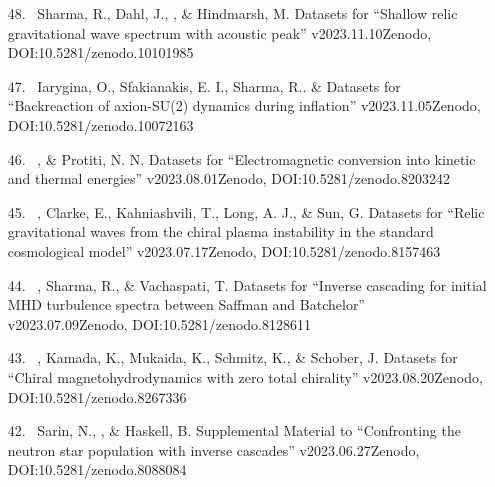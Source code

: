 \begin{itemize}
\item[{48.}~]
Sharma, R., Dahl, J., \Brandenburg, \& Hindmarsh, M.
{Datasets for ``Shallow relic gravitational wave spectrum with acoustic peak'' v2023.11.10}{Zenodo, DOI:10.5281/zenodo.10101985}

\item[{47.}~]
Iarygina, O., Sfakianakis, E. I., Sharma, R.. \& \Brandenburg{}
{Datasets for ``Backreaction of axion-SU(2) dynamics during inflation'' v2023.11.05}{Zenodo, DOI:10.5281/zenodo.10072163}

\item[{46.}~]
\Brandenburg, \& Protiti, N. N.
{Datasets for ``Electromagnetic conversion into kinetic and thermal energies'' v2023.08.01}{Zenodo, DOI:10.5281/zenodo.8203242}

\item[{45.}~]
\Brandenburg, Clarke, E., Kahniashvili, T., Long, A. J., \& Sun, G.
{Datasets for ``Relic gravitational waves from the chiral plasma instability in the standard cosmological model'' v2023.07.17}{Zenodo, DOI:10.5281/zenodo.8157463}

\item[{44.}~]
\Brandenburg, Sharma, R., \& Vachaspati, T.
{Datasets for ``Inverse cascading for initial MHD turbulence spectra between Saffman and Batchelor'' v2023.07.09}{Zenodo, DOI:10.5281/zenodo.8128611}

\item[{43.}~]
\Brandenburg, Kamada, K., Mukaida, K., Schmitz, K., \& Schober, J.
{Datasets for ``Chiral magnetohydrodynamics with zero total chirality'' v2023.08.20}{Zenodo, DOI:10.5281/zenodo.8267336}

\item[{42.}~]
Sarin, N., \Brandenburg, \& Haskell, B.
{Supplemental Material to ``Confronting the neutron star population with inverse cascades'' v2023.06.27}{Zenodo, DOI:10.5281/zenodo.8088084}


\end{itemize}
